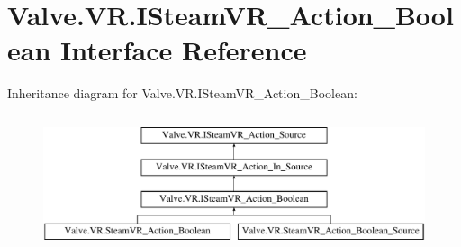 \hypertarget{interface_valve_1_1_v_r_1_1_i_steam_v_r___action___boolean}{}\section{Valve.\+V\+R.\+I\+Steam\+V\+R\+\_\+\+Action\+\_\+\+Boolean Interface Reference}
\label{interface_valve_1_1_v_r_1_1_i_steam_v_r___action___boolean}
Inheritance diagram for Valve.\+V\+R.\+I\+Steam\+V\+R\+\_\+\+Action\+\_\+\+Boolean\+:\begin{figure}[H]
\begin{center}
\leavevmode
\includegraphics[height=4.000000cm]{interface_valve_1_1_v_r_1_1_i_steam_v_r___action___boolean}
\end{center}
\end{figure}
